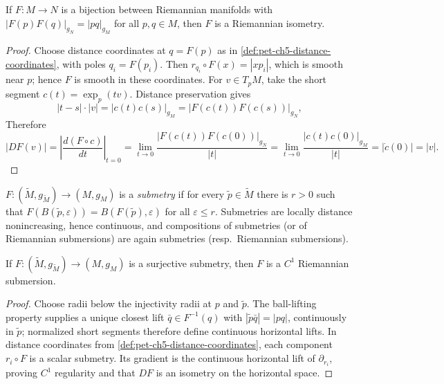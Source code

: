\begin{theorem}
  \label{thm:pet-ch5-myers-steenrod-isometry}
  If $F:M\to N$ is a bijection between Riemannian manifolds with
  $|F(p)F(q)|_{g_N}=|pq|_{g_M}$ for all $p,q\in M$, then $F$ is a Riemannian
  isometry.
\end{theorem}
\begin{proof}
  \sketch
  Choose distance coordinates at $q=F(p)$ as in
  \cref{def:pet-ch5-distance-coordinates}, with poles $q_i=F(p_i)$.  Then
  $r_{q_i}\circ F(x)=|xp_i|$, which is smooth near $p$; hence $F$ is smooth in
  these coordinates.  For $v\in T_pM$, take the short segment
  $c(t)=\exp_p(tv)$.  Distance preservation gives
  \[
    |t-s|\cdot|v|=|c(t)c(s)|_{g_M}=|F(c(t))F(c(s))|_{g_N},
  \]
  Therefore
  \[
    |DF(v)|=\left|\frac{d(F\circ c)}{dt}\right|_{t=0}
    =\lim_{t\to0}\frac{|F(c(t))F(c(0))|_{g_N}}{|t|}
    =\lim_{t\to0}\frac{|c(t)c(0)|_{g_M}}{|t|}=|\dot c(0)|=|v|.
  \]
\end{proof}

\begin{definition}[submetry]
  \label{def:pet-ch5-submetry}
  \leanok
  $F:(\tilde M,g_{\tilde M})\to(M,g_M)$ is a \emph{submetry} if for every
  $\tilde p\in\tilde M$ there is $r>0$ such that $F(B(\tilde p,\varepsilon))=
  B(F(\tilde p),\varepsilon)$ for all $\varepsilon\le r$. Submetries are locally
  distance nonincreasing, hence continuous, and compositions of submetries (or of
  Riemannian submersions) are again submetries (resp.\ Riemannian submersions).
\end{definition}

\begin{theorem}
  \label{thm:pet-ch5-berestovskii-submetry}
  If $F:(\tilde M,g_{\tilde M})\to(M,g_M)$ is a surjective submetry, then $F$ is a
  $C^1$ Riemannian submersion.
\end{theorem}
\begin{proof}
  \sketch
  Choose radii below the injectivity radii at $p$ and $\tilde p$.  The ball-lifting
  property supplies a unique closest lift $\bar q\in F^{-1}(q)$ with
  $|\tilde p\bar q|=|pq|$, continuously in $\tilde p$; normalized short segments
  therefore define continuous horizontal lifts.  In distance coordinates from
  \cref{def:pet-ch5-distance-coordinates}, each component $r_i\circ F$ is a scalar
  submetry.  Its gradient is the continuous horizontal lift of $\partial_{r_i}$,
  proving $C^1$ regularity and that $DF$ is an isometry on the horizontal space.
\end{proof}

